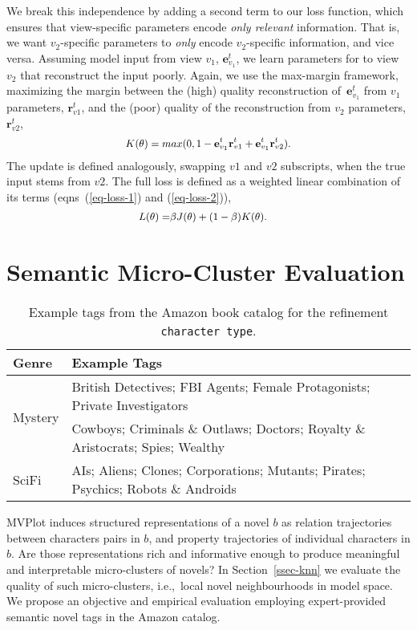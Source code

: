 \documentclass[11pt,letterpaper]{article}
\begin{document}
We break this independence by adding a second term to our loss function, which ensures that view-specific parameters encode {\it only relevant} information. That is, we want $v_2$-specific parameters to {\it only} encode $v_2$-specific information, and vice versa. Assuming model input from view $v_1$, $\mathbf{e}^t_{v_1}$, we learn parameters for to view $v_2$ that reconstruct the input poorly. Again, we use the max-margin framework, maximizing the margin between the (high) quality reconstruction of~$\mathbf{e}^t_{v_1}$ from $v_1$ parameters, $\mathbf{r}_{v1}^t$, and the (poor) quality of the reconstruction from $v_2$ parameters, $\mathbf{r}_{v2}^t$,
\begin{equation}
\small
 \begin{aligned}
   \label{eq-loss-2}
  K(\theta) = max(0, 1-\mathbf{e}^t_{v_1}\mathbf{r}_{v1}^{t} + \mathbf{e}^t_{v_1}\mathbf{r}_{v2}^{t}).
 \end{aligned}
\end{equation}
The update is defined analogously, swapping $v1$ and $v2$ subscripts, when the true input stems from $v2$.
The full loss is defined as a weighted linear combination of its terms (eqns~(\ref{eq-loss-1}) and (\ref{eq-loss-2})),
\begin{equation}
\small
 \begin{aligned}
  L(\theta) = &\beta J(\theta) + (1-\beta) K(\theta).
 \end{aligned}
\end{equation}



\section{Semantic Micro-Cluster Evaluation}
\label{sec-task}
\begin{table}
\small{\begin{tabular}{p{1cm}p{5.9cm}}
  \hline
  {\bf Genre} & {\bf Example Tags} \\\hline
  \multirow{2}{*}{Mystery} & British Detectives; FBI Agents; Female Protagonists; Private Investigators\\
  \multirow{2}{*}{Romance} & Cowboys; Criminals \& Outlaws; Doctors; Royalty \& Aristocrats; Spies; Wealthy\\
  \multirow{2}{*}{SciFi}   & AIs; Aliens; Clones; Corporations; Mutants; Pirates; Psychics; Robots \& Androids\\\hline
 \end{tabular}}
 \caption{Example tags from the Amazon book catalog for the refinement {\tt character type}.}
 \label{fig-Amazon-tags}
\end{table}
MVPlot induces structured representations of a novel $b$ as relation trajectories between characters pairs in $b$, and property trajectories of individual characters in $b$. Are those representations rich and informative enough to produce meaningful and interpretable micro-clusters of novels? In Section~\ref{ssec-knn} we evaluate the quality of such micro-clusters, i.e.,~local novel neighbourhoods in model space. We propose an objective and empirical evaluation employing expert-provided semantic novel tags in the Amazon catalog.
\end{document}
